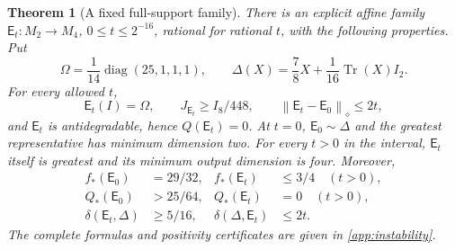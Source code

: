 \documentclass[11pt,reqno]{amsart}
\newtheorem{theorem}{Theorem}[section]
\theoremstyle{definition}
\theoremstyle{remark}
\numberwithin{equation}{section}
\DeclareMathOperator{\Tr}{Tr}
\DeclareMathOperator{\diag}{diag}
\newcommand{\E}{\mathsf E}
\newcommand{\norm}[1]{\left\lVert#1\right\rVert}
\newcommand{\defic}{\delta}
\begin{document}
\begin{theorem}[A fixed full-support family]\label{thm:instability}
There is an explicit affine family $\E_t:M_2\to M_4$, $0\le t\le2^{-16}$, rational for rational $t$, with the following properties. Put
\[
 \Omega=\frac1{14}\diag(25,1,1,1),\qquad
 \Delta(X)=\frac78X+\frac1{16}\Tr(X)I_2.
\]
For every allowed $t$,
\[
 \E_t(I)=\Omega,\qquad J_{\E_t}\ge I_8/448,\qquad
 \norm{\E_t-\E_0}_\diamond\le2t,
\]
and $\E_t$ is antidegradable, hence $Q(\E_t)=0$. At $t=0$, $\E_0\sim\Delta$ and the greatest representative has minimum dimension two. For every $t>0$ in the interval, $\E_t$ itself is greatest and its minimum output dimension is four. Moreover,
\begin{align}
 f_*(\E_0)&=29/32,& f_*(\E_t)&\le3/4\quad(t>0),\label{eq:f-jump}\\
 Q_*(\E_0)&>25/64,& Q_*(\E_t)&=0\quad(t>0),\label{eq:Q-jump}\\
 \defic(\E_t,\Delta)&\ge5/16,&
 \defic(\Delta,\E_t)&\le2t.\label{eq:asymmetric-gap}
\end{align}
The complete formulas and positivity certificates are given in \cref{app:instability}.
\end{theorem}
\end{document}
